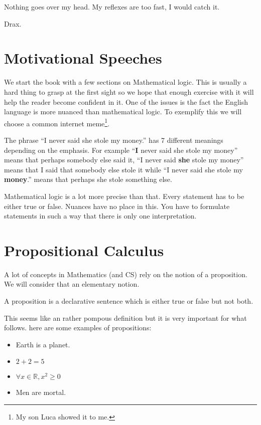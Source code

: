 \epigraph{Nothing goes over my head. My reflexes are too fast, I would catch it.}{ Drax.}

\section{Motivational Speeches}
We start the book with a  few sections on Mathematical logic. This is usually a hard thing to grasp at the first sight so we hope that enough exercise with it will help the reader become confident in it.
One of the issues is the fact the English language is more nuanced than mathematical logic. To exemplify this we will choose a common   internet meme\footnote{My son Luca showed it to me.}. 

The phrase
``I never said she stole my money.'' has 7 different meanings depending on the emphasis. For example ``{\bf I } never said she stole my money'' means that perhaps somebody else said it, ``I never said {\bf she} stole my money'' means that I said that somebody else stole it  while ``I never said she stole my {\bf money}.'' means that perhaps she stole something else.

 Mathematical logic is a lot more precise than that. Every statement has to be either true or false. Nuances have no place in this. You have to formulate statements in such a way that there is only one interpretation.



\section{Propositional Calculus}

A lot of concepts in Mathematics (and CS) rely on the notion of a proposition. We will consider that an elementary notion.

\begin{Definition}
A proposition  is a declarative sentence which is either true or false but not both.
\end{Definition}

This seems like an rather pompous definition but it is very important for what follows. here are some examples of propositions:
\begin{itemize}
\item Earth is a planet.
\item $2+2=5$
\item $\forall x \in \mathbb{R}, x^2 \ge 0$
\item Men are mortal.
\end{itemize}


